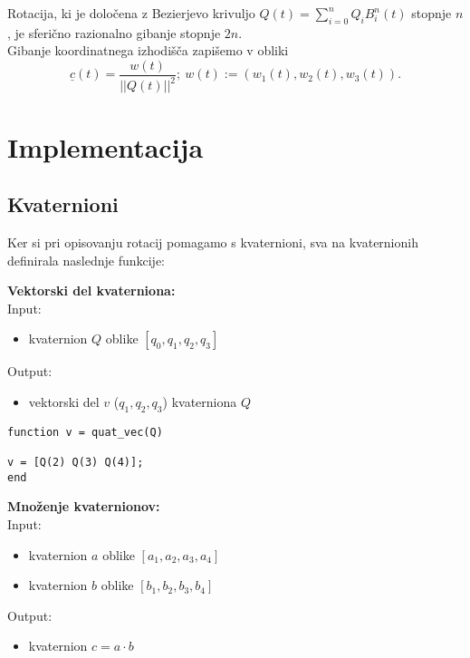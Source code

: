 \documentclass[12pt,a4paper,twoside]{article}
\theoremstyle{definition} %
\theoremstyle{plain} %
\numberwithin{equation}{section}  %
\begin{document}
\noindent Rotacija, ki je določena z Bezierjevo krivuljo $Q(t) = \sum\limits_{i=0}^{n} Q_i B_i^n(t)$ stopnje $n$, je sferično razionalno gibanje stopnje $2n$. \\

\noindent Gibanje koordinatnega izhodišča zapišemo v obliki
$$\underline{c}(t) = \frac{w(t)}{||Q(t)||^2};~ w(t) := (w_1(t), w_2(t),w_3(t)).$$

\noindent 


\newpage

\section{Implementacija}

\subsection{Kvaternioni}
Ker si pri opisovanju rotacij pomagamo s kvaternioni, sva na kvaternionih definirala naslednje funkcije:

%

\vspace{1cm}
\textbf{Vektorski del kvaterniona:}\\
Input:
\begin{itemize}
\item kvaternion $Q$ oblike $[q_0,q_1,q_2,q_3]$
\end{itemize}
Output:
\begin{itemize}
\item vektorski del $v$ ($q_1,q_2,q_3$) kvaterniona $Q$
\end{itemize}

\begin{lstlisting}[caption = {quat\_vec}]
function v = quat_vec(Q)

v = [Q(2) Q(3) Q(4)];
end
\end{lstlisting}


\vspace{1cm}
\textbf{Množenje kvaternionov:}\\
Input:
\begin{itemize}
\item kvaternion $a$ oblike $[a_1,a_2,a_3,a_4]$
\item kvaternion $b$ oblike $[b_1,b_2,b_3,b_4]$
\end{itemize}
Output:
\begin{itemize}
\item kvaternion $c = a \cdot b$
\end{itemize}
\end{document}

